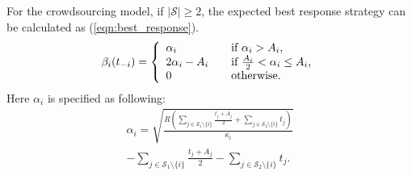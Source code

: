 \documentclass{IEEEtran}
\begin{document}
\begin{theorem}
\label{thr:best_response}
For the crowdsourcing model, if $|\mathcal{S}|\geq 2$, the expected best response strategy can be calculated as (\ref{eqn:best_response}).
\begin{equation}
\label{eqn:best_response}
\beta_i(t_{-i})=\left\{
\begin{array}{l l}
\alpha_i & \quad \text{if $\alpha_i> A_i$,}\\
2\alpha_i-A_i & \quad \text{if $\frac{A_i}{2}<\alpha_i\leq A_i$,}\\
0 & \quad \text{otherwise.}
\end{array} \right.
\end{equation}
Here $\alpha_i$ is specified as following:
\begin{equation}
\label{eqn:alpha}
\begin{aligned}
\alpha_i=\sqrt{\frac{R(\sum_{j\in \mathcal{S}_1\setminus\{i\}}\frac{t_j+A_j}{2}+\sum_{j\in \mathcal{S}_2\setminus\{i\}}t_j)}{\kappa_i}}\\-\sum_{j\in \mathcal{S}_1\setminus\{i\}}\frac{t_j+A_j}{2}-\sum_{j\in \mathcal{S}_2\setminus\{i\}}t_j.
\end{aligned}
\end{equation}
\end{theorem}
\end{document}
